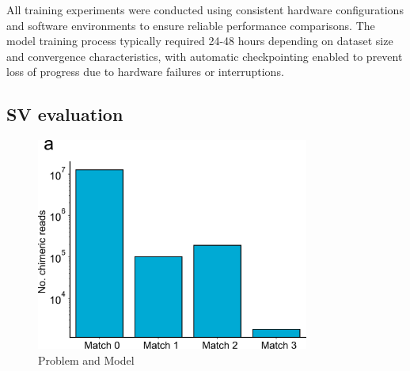 \documentclass[pdflatex,sn-nature]{sn-jnl}%
\theoremstyle{thmstyleone}%
\theoremstyle{thmstyletwo}%
\theoremstyle{thmstylethree}%
\begin{document}
All training experiments were conducted using consistent hardware configurations and software environments to ensure reliable performance comparisons.
The model training process typically required 24-48 hours depending on dataset size and convergence characteristics, with automatic checkpointing enabled to prevent loss of progress due to hardware failures or interruptions.

\subsection*{SV evaluation}



\backmatter


\makeatletter
\renewcommand{\theHfigure}{extended.\thefigure}
\renewcommand{\theHtable}{extended.\thetable}
\makeatother

\renewcommand{\figurename}{Extended Data Fig.}
\renewcommand{\tablename}{Extended Data Table}
\setcounter{figure}{0}
\setcounter{table}{0}

\begin{figure}[!ht]
	\begin{center}
		\includegraphics[width=0.8\textwidth]{final_figures/sf1}
	\end{center}
	\caption{Problem and Model}\label{fig:sf1}
\end{figure}
\end{document}
